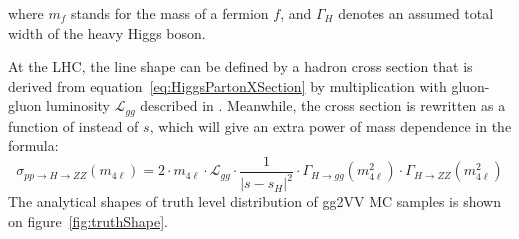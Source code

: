where $m_f$ stands for the mass of a fermion $f$, and $\Gamma_H$ denotes an assumed total width of the heavy Higgs boson.

At the LHC, the \mfl line shape can be defined by a hadron cross section that is derived from
equation~\ref{eq:HiggsPartonXSection} by multiplication with gluon-gluon luminosity $\mathcal{L}_{gg}$ described in
\cite{Ball:2012wy}. 
Meanwhile, the cross section is rewritten as a function of \mfl instead of $s$, which will give an extra power of mass dependence in the formula:
\begin{equation} \label{eq:HiggsHadronXSection}
    \sigma_{pp \to H \to ZZ} (m_{4\ell}) = 2 \cdot m_{4\ell} \cdot \mathcal{L}_{gg} \cdot  \frac{1}{ \left | s - s_H \right |^2}  \cdot \Gamma_{H \to gg} (m_{4\ell}^2) \cdot \Gamma_{H \to ZZ} (m_{4\ell}^2)
\end{equation}
The analytical shapes of truth level \mfl distribution of gg2VV MC samples is shown on figure~\ref{fig:truthShape}.

